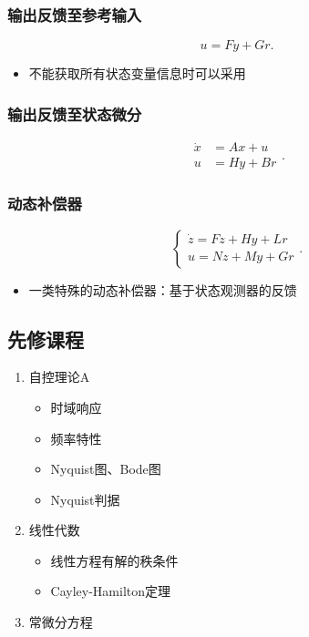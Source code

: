 \documentclass[14pt,a4paper]{article}
\theoremstyle{plain}
\theoremstyle{definition}
\theoremstyle{remark}
\theoremstyle{plain}
\theoremstyle{plain}
\theoremstyle{plain}
\theoremstyle{definition}
\theoremstyle{remark}
\numberwithin{equation}{section}
\begin{document}
			\subsubsection{输出反馈至参考输入}%
			\label{ssub:输出反馈至参考输入}
			
				\[
				u = Fy + Gr
				.\] 
				\begin{itemize}
					\item 不能获取所有状态变量信息时可以采用
				\end{itemize}

			\subsubsection{输出反馈至状态微分}%
			\label{ssub:输出反馈至状态微分}
			
				\[
				\begin{split}
					\dot x &= Ax + u \\
					u &= Hy + Br
				\end{split}
				.\] 

			\subsubsection{动态补偿器}%
			\label{ssub:动态补偿器}

				\[
				\begin{cases}
					\dot z = Fz + Hy + Lr  \\
					u = Nz + My + Gr
				\end{cases}
				.\]
				\begin{itemize}
					\item 一类特殊的动态补偿器：基于状态观测器的反馈
				\end{itemize}

		\subsection{先修课程}%
		\label{sub:先修课程}
		
			\begin{enumerate}
				\item 自控理论A
					\begin{itemize}
						\item 时域响应
						\item 频率特性
						\item Nyquist图、Bode图
						\item Nyquist判据
					\end{itemize}
				\item 线性代数
					\begin{itemize}
						\item 线性方程有解的秩条件
						\item Cayley-Hamilton定理
					\end{itemize}
				\item 常微分方程
			\end{enumerate}	
	
\end{document}
